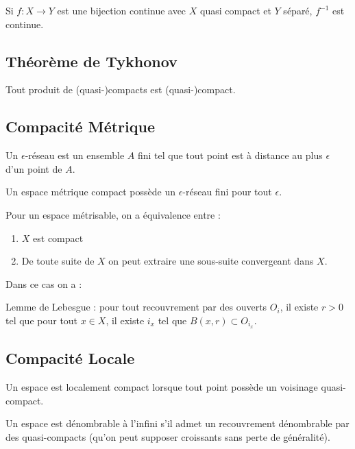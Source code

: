 \documentclass{cours}
\begin{document}
\begin{theorem}
    Si $f : X \rightarrow Y$ est une bijection continue avec $X$ quasi compact et $Y$ séparé, $f^{-1}$ est continue.
\end{theorem}

\subsection{Théorème de Tykhonov}
\begin{theorem}\label{thm:Tykhonov}
    Tout produit de (quasi-)compacts est (quasi-)compact.
\end{theorem}
\subsection{Compacité Métrique}
\begin{definition}
    Un $\epsilon$-réseau est un ensemble $A$ fini tel que tout point est à distance au plus $\epsilon$ d'un point de $A$.
\end{definition}

\begin{lemma}
    Un espace métrique compact possède un $\epsilon$-réseau fini pour tout $\epsilon$.
\end{lemma}

\begin{theorem}
    Pour un espace métrisable, on a équivalence entre :
    \begin{enumerate}
        \item $X$ est compact
        \item De toute suite de $X$ on peut extraire une sous-suite convergeant dans $X$.
    \end{enumerate}
    Dans ce cas on a :
    \item Lemme de Lebesgue : pour tout recouvrement par des ouverts $O_{i}$, il existe $r > 0$ tel que pour tout $x \in X$, il existe $i_{x}$ tel que $B(x, r) \subset O_{i_{x}}$.
\end{theorem}

\subsection{Compacité Locale}
\begin{definition}
    Un espace est localement compact lorsque tout point possède un voisinage quasi-compact.
\end{definition}

\begin{definition}
    Un espace est dénombrable à l'infini s'il admet un recouvrement dénombrable par des quasi-compacts (qu'on peut supposer croissants sans perte de généralité).
\end{definition}
\end{document}
